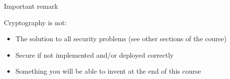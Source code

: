 \documentclass[aspectratio=169, lualatex, handout, 10pt,dvipsnames,svgnames]{beamer} %
\begin{document}

\begin{frame}{Important remark}

  \bigskip
  
  \begin{alertblock}{Cryptography is not:}
    \begin{itemize}
    \item The solution to all security problems (see other sections of the course)\medskip
    \item Secure if not implemented and/or deployed correctly\medskip
    \item Something you will be able to invent at the end of this course
    \end{itemize}
  \end{alertblock}
  
\end{frame}
\end{document}
